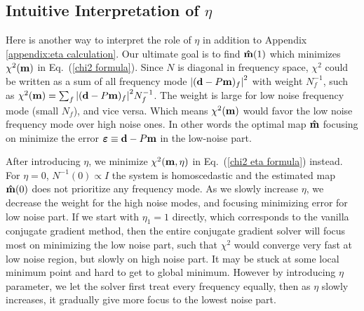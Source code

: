 \documentclass[twocolumn,linenumbers]{aastex631}
\newcommand{\vbd}{\vb{d}}
\newcommand{\vbm}{\vb{m}}
\newcommand{\inv}[1]{#1^{-1}}
\newcommand{\hatm}{\vb{\hat{m}}}
\begin{document}
\subsection{Intuitive Interpretation of $\eta$}\label{intuitive interp}


Here is another way to interpret the role of $\eta$ in addition to Appendix \ref{appendix:eta calculation}.
Our ultimate goal is to find $\hatm(1)$ which minimizes $\chi^2(\vbm)$ in Eq.~(\ref{chi2 formula}).
Since $N$ is diagonal in frequency space,
$\chi^2$ could be written as a sum of all frequency mode
$\qty|(\vbd-P\vbm)_f|^2$ with weight $\inv{N}_f$, such as
$\chi^2(\vbm) = \sum_f \qty|(\vbd-P\vbm)_f|^2 \inv{N}_f$.
The weight is large for low noise frequency mode (small $N_f$), and vice versa.
Which means $\chi^2(\vbm)$ would favor the low noise frequency mode over high
noise ones.
In other words the optimal map $\hatm$ focusing on minimize the error
$\vb*{\varepsilon} \equiv \vbd - P\vbm$ in the low-noise part.

After introducing $\eta$, we minimize
$\chi^2(\vbm,\eta)$ in Eq.~(\ref{chi2 eta formula}) instead.
For $\eta=0$, $N^{-1}(0) \propto I$ the system is homoscedastic and the estimated map $\hatm(0)$
does not prioritize any frequency mode.
As we slowly increase $\eta$, we decrease the weight for the high noise modes,
and focusing minimizing error for low noise part.
If we start with $\eta_1=1$ directly, which corresponds to the vanilla conjugate
gradient method, then the entire conjugate gradient solver
will focus most on minimizing the low noise part, such that $\chi^2$ would
converge very fast at low noise region, but slowly on high noise part.
It may be stuck at some local minimum point and hard to get to global minimum.
However by introducing $\eta$ parameter, we let the solver first treat every
frequency equally,
then as $\eta$ slowly increases, it gradually give more focus to the lowest noise part.
\end{document}
